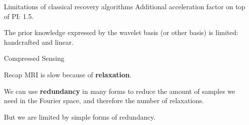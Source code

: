 


\begin{frame}{Limitations of classical recovery algorithms}
    Additional acceleration factor on top of PI: 1.5. %
    
    \pause
    The prior knowledge expressed by the wavelet basis (or other basis) is limited: handcrafted and linear.
\end{frame}

\begin{frame}{Compressed Sensing}
    \begin{block}{Recap}
        MRI is slow because of \textbf{relaxation}. 
        
        \pause
        We can use \textbf{redundancy} in many forms to reduce the amount of samples we need in the Fourier space, and therefore the number of relaxations.
        
        \pause
        But we are limited by simple forms of redundancy.
    \end{block}
\end{frame}